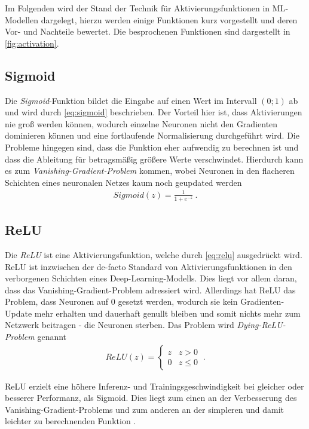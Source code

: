 Im Folgenden wird der Stand der Technik für Aktivierungsfunktionen in \ac{ML}-Modellen dargelegt,
hierzu werden einige Funktionen kurz vorgestellt und deren Vor- und Nachteile bewertet. 
Die besprochenen Funktionen sind dargestellt in \autoref{fig:activation}.

\subsection{Sigmoid}

Die \textit{Sigmoid}-Funktion bildet die Eingabe auf einen Wert im Intervall $(0;1)$ ab und wird durch \autoref{eq:sigmoid} beschrieben.
Der Vorteil hier ist, dass Aktivierungen nie groß werden können, wodurch einzelne Neuronen nicht den Gradienten dominieren können und 
eine fortlaufende Normalisierung durchgeführt wird. Die Probleme hingegen sind, dass die Funktion eher aufwendig zu berechnen ist 
und dass die Ableitung für betragsmäßig größere Werte verschwindet. Hierdurch kann es zum \textit{Vanishing-Gradient-Problem} kommen, wobei 
Neuronen in den flacheren Schichten eines neuronalen Netzes kaum noch geupdated werden \cite{Goodfellow.2016} 
\begin{align}
	\label{eq:sigmoid} Sigmoid(z) = \frac{1}{1+e^{-z}}~.
\end{align} 

\subsection{\acf{ReLU}} 

Die \textit{\acf{ReLU}} ist eine Aktivierungsfunktion, welche durch \autoref{eq:relu} ausgedrückt wird. 
\ac{ReLU} ist inzwischen der de-facto Standard von Aktivierungsfunktionen in den verborgenen Schichten eines Deep-Learning-Modells.
Dies liegt vor allem daran, dass das Vanishing-Gradient-Problem adressiert wird. Allerdings hat \ac{ReLU} das Problem, 
dass Neuronen auf $0$ gesetzt werden, wodurch sie kein Gradienten-Update mehr erhalten und dauerhaft genullt bleiben 
und somit nichts mehr zum Netzwerk beitragen - die Neuronen sterben. Das Problem wird \textit{Dying-\ac{ReLU}-Problem} genannt \cite{Goodfellow.2016} 
\begin{align}
	\label{eq:relu} ReLU(z) = \begin{cases} 
		z & z > 0 \\
		0 & z \leq 0 
	\end{cases}~.
\end{align} 

\ac{ReLU} erzielt eine höhere Inferenz- und Trainingsgeschwindigkeit bei gleicher oder besserer Performanz, 
als Sigmoid. Dies liegt zum einen an der Verbesserung des Vanishing-Gradient-Problems und zum anderen an der 
simpleren und damit leichter zu berechnenden Funktion \cite{Goodfellow.2016}.

